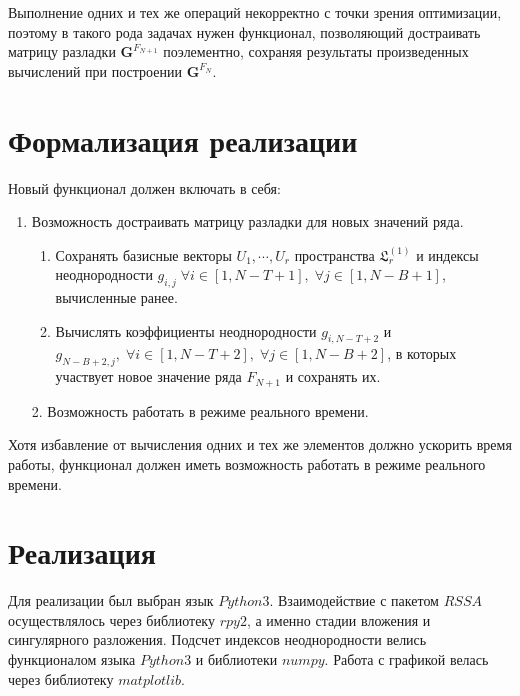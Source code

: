 \documentclass[specialist, substylefile = spbu.rtx,
			   subf, href, 12pt]{disser}
\begin{document}
Выполнение одних и тех же операций некорректно с точки зрения оптимизации, поэтому в такого рода задачах нужен функционал, позволяющий достраивать матрицу разладки $ \mathbf{G}^{F_{N+1}} $ поэлементно, сохраняя результаты произведенных вычислений при построении $ \mathbf{G}^{F_N} $. 

\section{Формализация реализации}
Новый функционал должен включать в себя:
\begin{enumerate}
	\item
	Возможность достраивать матрицу разладки для новых значений ряда.
	\begin{enumerate}
		\item
		Сохранять базисные векторы $U_1, \cdots, U_r$ пространства $ \mathfrak{L}_r^{(1)} $ и индексы неоднородности $g_{i,j} \; \forall i \in [1, N-T+1], \; \forall j \in [1, N-B+1]$, вычисленные ранее.
		\item
		Вычислять коэффициенты неоднородности $g_{i, N-T+2}$ и $g_{N-B+2, j},\; \forall i \in [1, N-T+2], \; \forall j \in [1, N-B+2]$, в которых участвует новое значение ряда $F_{N+1}$ и сохранять их.
	\end{enumerate}
2. Возможность работать в режиме реального времени.
\end{enumerate}

Хотя избавление от вычисления одних и тех же элементов должно ускорить время работы, функционал должен иметь возможность работать в режиме реального времени.

\section{Реализация}
Для реализации был выбран язык $Python3$. Взаимодействие с пакетом $RSSA$ осуществлялось через библиотеку $rpy2$, а именно стадии вложения и сингулярного разложения. Подсчет индексов неоднородности велись функционалом языка $Python3$ и библиотеки $numpy$. Работа с графикой велась через библиотеку $matplotlib$.
\end{document}
